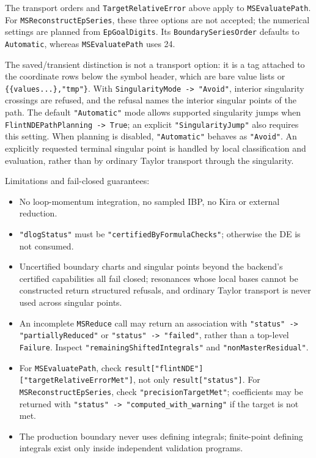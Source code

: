 \documentclass[11pt,a4paper]{article}
\begin{document}
The transport orders and \texttt{TargetRelativeError} above apply to
\texttt{MSEvaluatePath}. For \texttt{MSReconstructEpSeries}, these three options
are not accepted; the numerical settings are planned from \texttt{EpGoalDigits}.
Its \texttt{BoundarySeriesOrder} defaults to \texttt{Automatic}, whereas
\texttt{MSEvaluatePath} uses 24.

The saved/transient distinction is not a transport option: it is a tag attached to the coordinate
rows below the symbol header, which are bare value lists or \texttt{\{\{values...\},"tmp"\}}.
With \texttt{SingularityMode -> "Avoid"}, interior singularity crossings are refused, and the
refusal names the interior singular points of the path. The default \texttt{"Automatic"} mode
allows supported singularity jumps when \texttt{FlintNDEPathPlanning -> True};
an explicit \texttt{"SingularityJump"} also requires this setting.
When planning is disabled, \texttt{"Automatic"} behaves as \texttt{"Avoid"}.
An explicitly requested
terminal singular point is handled by local classification and evaluation,
rather than by ordinary Taylor transport through the singularity.


Limitations and fail-closed guarantees:
\begin{itemize}
  \item No loop-momentum integration, no sampled IBP, no Kira or external reduction.
  \item \texttt{"dlogStatus"} must be \texttt{"certifiedByFormulaChecks"}; otherwise the DE is not
        consumed.
  \item Uncertified boundary charts and singular points beyond the
        backend's certified capabilities all fail closed; resonances whose local bases cannot be
        constructed return structured refusals, and ordinary Taylor transport is never used across
        singular points.
  \item An incomplete \texttt{MSReduce} call may return an association with
        \texttt{"status" -> "partiallyReduced"} or \texttt{"status" -> "failed"},
        rather than a top-level \texttt{Failure}. Inspect
        \texttt{"remainingShiftedIntegrals"} and \texttt{"nonMasterResidual"}.
  \item For \texttt{MSEvaluatePath}, check
        \texttt{result["flintNDE"]["targetRelativeErrorMet"]}, not only
        \texttt{result["status"]}. For \texttt{MSReconstructEpSeries}, check
        \texttt{"precisionTargetMet"}; coefficients may be returned with
        \texttt{"status" -> "computed\_with\_warning"} if the target is not met.
  \item The production boundary never uses defining integrals; finite-point defining integrals
        exist only inside independent validation programs.
\end{itemize}
\end{document}

